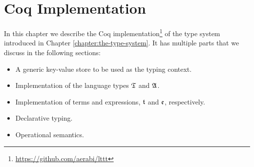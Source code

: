 \chapter{Coq Implementation}\label{chap:coq-implementation}

In this chapter we describe the Coq implementation\footnote{\url{https://github.com/aerabi/lttt}} of the type system introduced in Chapter \ref{chapter:the-type-system}. It has multiple parts that we discuss in the following sections:
\begin{itemize}
    \item A generic key-value store to be used as the typing context.
    \item Implementation of the language types $\mathfrak{T}$ and $\mathfrak{A}$.
    \item Implementation of terms and expressions, $\mathfrak{t}$ and $\mathfrak{e}$, respectively.
    \item Declarative typing.
    \item Operational semantics.
\end{itemize}


